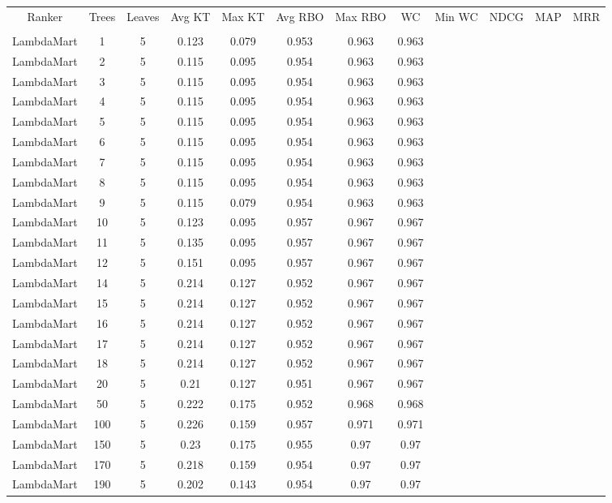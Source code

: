\begin{longtable}{*{12}{c}}
Ranker & Trees & Leaves & Avg KT & Max KT & Avg RBO & Max RBO & WC & Min WC & NDCG & MAP & MRR  \\\\ 
LambdaMart & 1 & 5 & 0.123 & 0.079 & 0.953 & 0.963 & 0.963 \\ 
LambdaMart & 2 & 5 & 0.115 & 0.095 & 0.954 & 0.963 & 0.963 \\ 
LambdaMart & 3 & 5 & 0.115 & 0.095 & 0.954 & 0.963 & 0.963 \\ 
LambdaMart & 4 & 5 & 0.115 & 0.095 & 0.954 & 0.963 & 0.963 \\ 
LambdaMart & 5 & 5 & 0.115 & 0.095 & 0.954 & 0.963 & 0.963 \\ 
LambdaMart & 6 & 5 & 0.115 & 0.095 & 0.954 & 0.963 & 0.963 \\ 
LambdaMart & 7 & 5 & 0.115 & 0.095 & 0.954 & 0.963 & 0.963 \\ 
LambdaMart & 8 & 5 & 0.115 & 0.095 & 0.954 & 0.963 & 0.963 \\ 
LambdaMart & 9 & 5 & 0.115 & 0.079 & 0.954 & 0.963 & 0.963 \\ 
LambdaMart & 10 & 5 & 0.123 & 0.095 & 0.957 & 0.967 & 0.967 \\ 
LambdaMart & 11 & 5 & 0.135 & 0.095 & 0.957 & 0.967 & 0.967 \\ 
LambdaMart & 12 & 5 & 0.151 & 0.095 & 0.957 & 0.967 & 0.967 \\ 
LambdaMart & 14 & 5 & 0.214 & 0.127 & 0.952 & 0.967 & 0.967 \\ 
LambdaMart & 15 & 5 & 0.214 & 0.127 & 0.952 & 0.967 & 0.967 \\ 
LambdaMart & 16 & 5 & 0.214 & 0.127 & 0.952 & 0.967 & 0.967 \\ 
LambdaMart & 17 & 5 & 0.214 & 0.127 & 0.952 & 0.967 & 0.967 \\ 
LambdaMart & 18 & 5 & 0.214 & 0.127 & 0.952 & 0.967 & 0.967 \\ 
LambdaMart & 20 & 5 & 0.21 & 0.127 & 0.951 & 0.967 & 0.967 \\ 
LambdaMart & 50 & 5 & 0.222 & 0.175 & 0.952 & 0.968 & 0.968 \\ 
LambdaMart & 100 & 5 & 0.226 & 0.159 & 0.957 & 0.971 & 0.971 \\ 
LambdaMart & 150 & 5 & 0.23 & 0.175 & 0.955 & 0.97 & 0.97 \\ 
LambdaMart & 170 & 5 & 0.218 & 0.159 & 0.954 & 0.97 & 0.97 \\ 
LambdaMart & 190 & 5 & 0.202 & 0.143 & 0.954 & 0.97 & 0.97 \\ 

\end{longtable}
